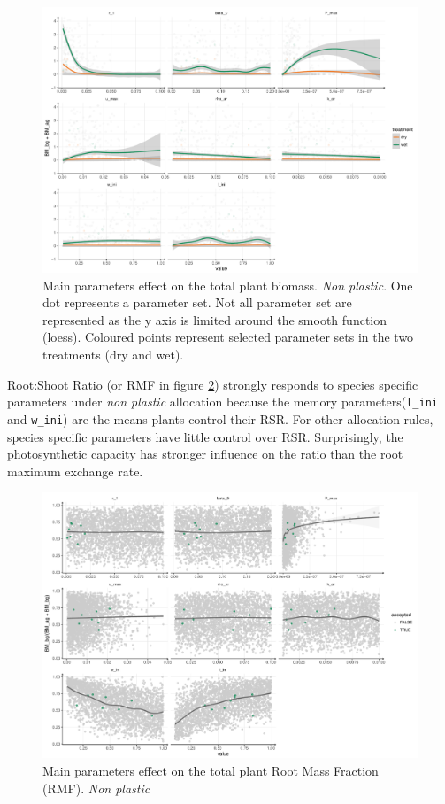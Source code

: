 \begin{figure}\label{fig:sensitivity_BM}
\includegraphics[width = \textwidth]{./2_PP/Figures/Calibration/par_effect_none_BM.pdf}
\caption{Main parameters effect on the total plant biomass. \textit{Non plastic}. One dot represents a parameter set. Not all parameter set are represented as the y axis is limited around the smooth function (loess). Coloured points represent selected parameter sets in the two treatments (\textcolor{myOrange}{dry} and \textcolor{myGreen}{wet}).}
\end{figure}

Root:Shoot Ratio (or RMF in figure \ref{fig:sensitivity_RSR}) strongly responds to species specific parameters under \textit{non plastic} allocation because the memory parameters(\texttt{l\_ini} and \texttt{w\_ini}) are the means plants control their RSR. For other allocation rules, species specific parameters have little control over RSR. Surprisingly, the photosynthetic capacity has stronger influence on the ratio than the root maximum exchange rate.


\begin{figure}\label{fig:sensitivity_RSR}
\includegraphics[width = \textwidth]{./2_PP/Figures/Calibration/par_effect_none_RSR.pdf}
\caption{Main parameters effect on the total plant Root Mass Fraction (RMF). \textit{Non plastic}}
\end{figure}


